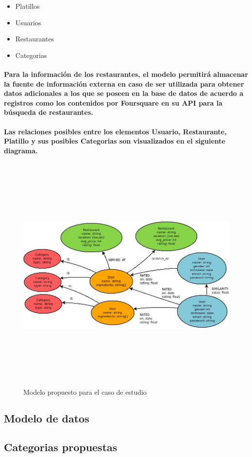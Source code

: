 \begin{itemize}
  \item Platillos
  \item Usuarios
  \item Restaurantes
  \item Categorias 
\end{itemize}

\paragraph{Para la información de los restaurantes, el modelo  permitirá almacenar la fuente de información externa en caso de ser utilizada para obtener datos adicionales a los que se poseen en la base de datos de acuerdo a registros como los contenidos por Foursquare en su API para la búsqueda de restaurantes.}

\paragraph{Las relaciones posibles entre los elementos Usuario, Restaurante, Platillo y sus posibles Categorias son visualizados en el siguiente diagrama.}

\newpage
    \begin{landscape}
      \begin{figure}[h!]
      \centering
      \includegraphics[width=22.5cm,height=12cm]{./images/Modelo_datos.jpg}
      \caption{Modelo propuesto para el caso de estudio}
    \end{figure}
    \end{landscape}
  \newpage

\newpage
\subsection{Modelo de datos}
   
\newpage
\subsection{Categorias propuestas}
   

